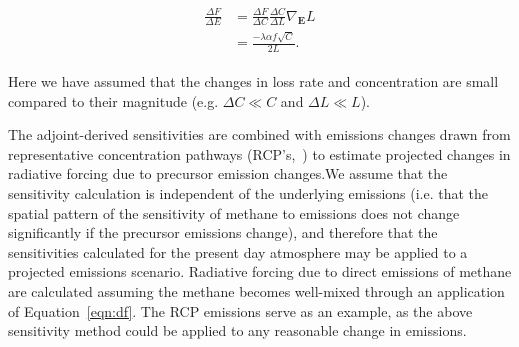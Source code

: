\begin{equation}
\begin{align}
\begin{split}
\frac{\Delta F}{\Delta E} &= \frac{\Delta F}{\Delta C} \frac{\Delta C}{\Delta L} \nabla_{\mathbf{E}} L \\
                          &= \frac{-\lambda \alpha f \sqrt{C}}{2L}.
\end{split}
\label{eqn:dfde}
\end{align}
\end{equation}

Here we have assumed that the changes in loss rate and concentration are small compared to their magnitude (e.g. $\Delta C \ll C$ and $\Delta L \ll L$).

The adjoint-derived sensitivities are combined with emissions changes drawn from representative concentration pathways (RCP's,~\citet{ref:lamarque2011,ref:vanvuuren2011}) to estimate projected changes in radiative forcing due to precursor emission changes.We assume that the sensitivity calculation is independent of the underlying emissions (i.e. that the spatial pattern of the sensitivity of methane to emissions does not change significantly if the precursor emissions change), and therefore that the sensitivities calculated for the present day atmosphere may be applied to a projected emissions scenario. Radiative forcing due to direct emissions of methane are calculated assuming the methane becomes well-mixed through an application of Equation~\ref{eqn:df}. The RCP emissions serve as an example, as the above sensitivity method could be applied to any reasonable change in emissions.